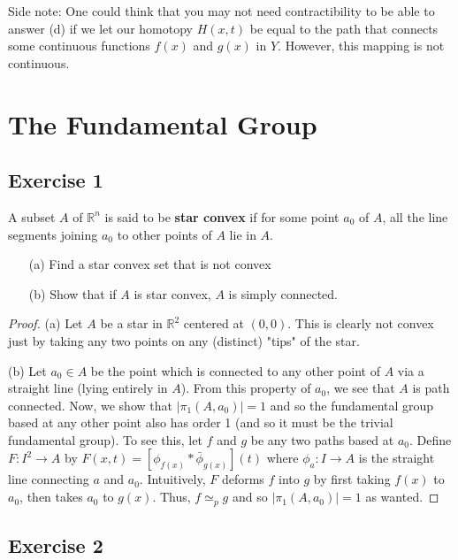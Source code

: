 \documentclass{article}
\begin{document}
Side note: One could think that you may not need contractibility to be able to answer (d) if we let our homotopy $H(x,t)$ be equal to the path that connects some continuous functions $f(x)$ and $g(x)$
in $Y$. However, this mapping is not continuous.

\section{The Fundamental Group}

\subsection*{Exercise 1}

A subset $A$ of $\mathbb{R}^n$ is said to be \textbf{star convex} if for some point $a_0$ of $A$, all the line segments joining $a_0$ to other points of $A$ lie in $A$.
\begin{enumerate}
	\item[(a)] Find a star convex set that is not convex
	\item[(b)] Show that if $A$ is star convex, $A$ is simply connected.
\end{enumerate}
\begin{proof}
	\item[(a)] Let $A$ be a star in $\mathbb{R}^2$ centered at $(0,0)$. This is clearly not convex just by taking any two points on any (distinct) "tips" of the star.
	\item[(b)] Let $a_0\in A$ be the point which is connected to any other point of $A$ via a straight line (lying entirely in $A$). 
	From this property of $a_0$, we see that $A$ is path connected. Now, we show that $|\pi_1 (A,a_0)| = 1$ and so the fundamental group based at any other point also has order 1 
	(and so it must be the trivial fundamental group). To see this, let $f$ and $g$ be any two paths based at $a_0$. 
	Define $F: I^2 \to A$ by $F(x,t) = [\phi_{f(x)} * \bar{\phi}_{g(x)}] (t)$ where $\phi_a: I\to A$ is the straight line connecting $a$ and $a_0$. Intuitively, $F$ deforms $f$ into $g$ by first
	taking $f(x)$ to $a_0$, then takes $a_0$ to $g(x)$. Thus, $f\simeq_p g$ and so $|\pi_1(A,a_0)| = 1$ as wanted.
\end{proof}

\subsection*{Exercise 2}
\end{document}
